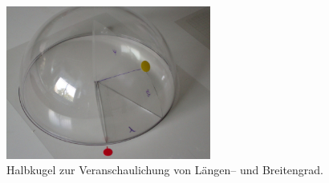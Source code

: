 \documentclass[a4paper,12pt]{article}
\begin{document}
\begin{figure}[ht]
\begin{center}
\includegraphics[width=0.6\textwidth]{../common/latlon.jpg}
\caption{Halbkugel zur Veranschaulichung von Längen-- und Breitengrad.}
\label{fig-halbkugel}
\end{center}
\end{figure}
\end{document}
